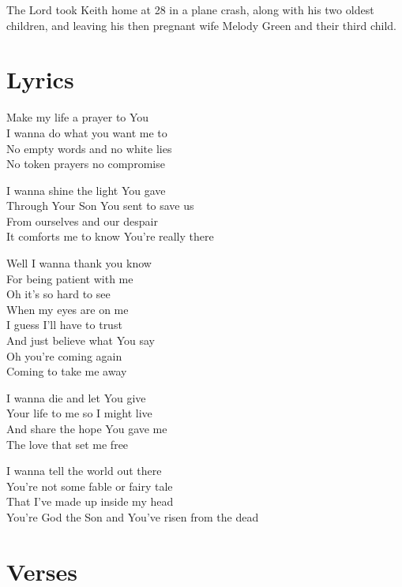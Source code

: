 \documentclass[10pt,a4paper,oneside,twocolumn]{book}
\begin{document}
The Lord took Keith home at 28 in a plane crash, along with his two oldest children, and leaving his then pregnant wife Melody Green and their third child.

\section{Lyrics}
\begin{flushleft}
Make my life a prayer to You\\
I wanna do what you want me to\\
No empty words and no white lies\\
No token prayers no compromise
\medskip 


I wanna shine the light You gave\\
Through Your Son You sent to save us\\
From ourselves and our despair\\
It comforts me to know You're really there
\medskip 

Well I wanna thank you know\\
For being patient with me\\
Oh it's so hard to see\\
When my eyes are on me\\
I guess I'll have to trust\\
And just believe what You say\\
Oh you're coming again\\
Coming to take me away
\medskip 

I wanna die and let You give\\
Your life to me so I might live\\
And share the hope You gave me\\
The love that set me free\\
\medskip 

I wanna tell the world out there\\
You're not some fable or fairy tale\\
That I've made up inside my head\\
You're God the Son and You've risen from the dead
\end{flushleft}

\section{Verses}
\end{document}
